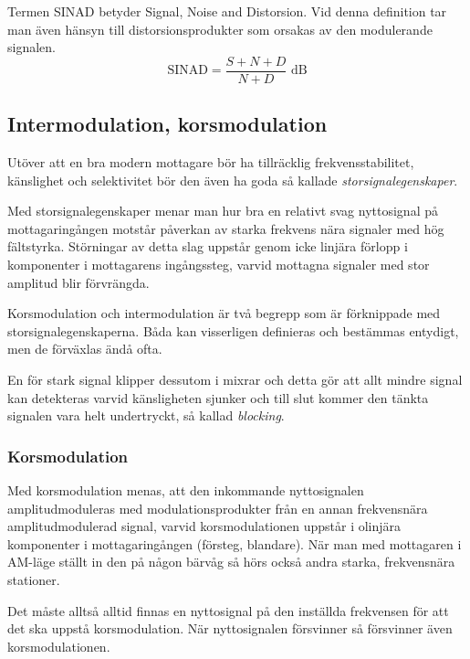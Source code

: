 Termen SINAD betyder Signal, Noise and Distorsion.
Vid denna definition tar man även hänsyn till distorsionsprodukter som orsakas
av den modulerande signalen.
\[
\text{SINAD} = \frac{S+N+D}{N+D}\text{ dB}
\]

\subsection{Intermodulation, korsmodulation}
\label{intermodulation}

Utöver att en bra modern mottagare bör ha tillräcklig frekvensstabilitet,
känslighet och selektivitet bör den även ha goda så kallade
\emph{storsignalegenskaper}.

Med storsignalegenskaper menar man hur bra en relativt svag nyttosignal på
mottagaringången motstår påverkan av starka frekvens nära signaler med hög
fältstyrka.
Störningar av detta slag uppstår genom icke linjära förlopp i komponenter i
mottagarens ingångssteg, varvid mottagna signaler med stor amplitud blir
förvrängda.

Korsmodulation och intermodulation är två begrepp som är förknippade
med storsignalegenskaperna.
Båda kan visserligen definieras och bestämmas entydigt, men de förväxlas ändå
ofta.

En för stark signal klipper dessutom i mixrar och detta gör att allt mindre
signal kan detekteras varvid känsligheten sjunker och till slut kommer den
tänkta signalen vara helt undertryckt, så kallad \emph{blocking}.

\subsubsection{Korsmodulation}

Med korsmodulation menas, att den inkommande nyttosignalen amplitudmoduleras
med modulationsprodukter från en annan frekvensnära amplitudmodulerad signal,
varvid korsmodulationen uppstår i olinjära komponenter i mottagaringången
(försteg, blandare).
När man med mottagaren i AM-läge ställt in den på någon bärvåg så hörs också
andra starka, frekvensnära stationer.

Det måste alltså alltid finnas en nyttosignal på den inställda frekvensen för
att det ska uppstå korsmodulation.
När nyttosignalen försvinner så försvinner även korsmodulationen.

